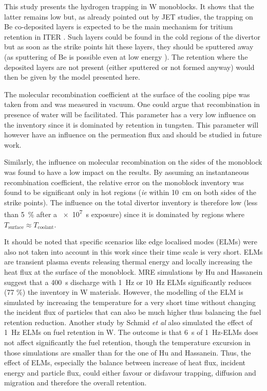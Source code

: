 This study presents the hydrogen trapping in W monoblocks.
It shows that the latter remains low but, as already pointed out by JET studies, the trapping on Be co-deposited layers is expected to be the main mechanism for tritium retention in ITER .
Such layers could be found in the cold regions of the divertor but as soon as the strike points hit these layers, they should be sputtered away (as sputtering of Be is possible even at low energy \cite{bjorkas_variables_2013, brezinsek_beryllium_2015}).
The retention where the deposited layers are not present (either sputtered or not formed anyway) would then be given by the model presented here.

The molecular recombination coefficient at the surface of the cooling pipe was taken from  and was measured in vacuum.
One could argue that recombination in presence of water will be facilitated.
This parameter has a very low influence on the inventory since it is dominated by retention in tungsten.
This parameter will however have an influence on the permeation flux and should be studied in future work.

Similarly, the influence on molecular recombination on the sides of the monoblock was found to have a low impact on the results.
By assuming an instantaneous recombination coefficient, the relative error on the monoblock inventory was found to be significant only in hot regions (\textit{ie} within \SI{10}{cm} on both sides of the strike points).
The influence on the total divertor inventory is therefore low (less than \SI{5}{\%} after a \SI{e7}{s} exposure) since it is dominated by regions where $T_\mathrm{surface} \approx T_\mathrm{coolant}$.

It should be noted that specific scenarios like edge localised modes (ELMs) were also not taken into account in this work since their time scale is very short.
ELMs are transient plasma events releasing thermal energy and locally increasing the heat flux at the surface of the monoblock.
MRE simulations by Hu and Hassanein  suggest that a \SI{400}{s} discharge with \SI{1}{Hz} or \SI{10}{Hz} ELMs significantly reduces (77 \%) the inventory in W materials.
However, the modelling of the ELM is simulated by increasing the temperature for a very short time without changing the incident flux of particles that can also be much higher thus balancing the fuel retention reduction.
Another study by Schmid \textit{et al}  also simulated the effect of \SI{1}{Hz} ELMs on fuel retention in W.
The outcome is that \SI{6}{s} of \SI{1}{Hz}-ELMs does not affect significantly the fuel retention, though the temperature excursion in those simulations are smaller than for the one of Hu and Hassanein.
Thus, the effect of ELMs, especially the balance between increase of heat flux, incident energy and particle flux, could either favour or disfavour trapping, diffusion and migration and therefore the overall retention.

